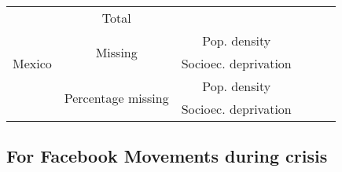 \documentclass[
  11pt,
]{article}
\begin{document}
\begin{table}[ht]
\begin{tabular}{cccccc}
  \multirow{5}{*}{ \;\; Mexico \;\; } & \;\;Total\;\; & & & & \\ 
  \cline{2-6}
  & \multirow{2}{*}{Missing} & \;\;Pop. density\;\; & & & \\
  & & \;\;Socioec. deprivation\;\; & & & \\
  \cline{2-6}
  & \multirow{2}{*}{Percentage missing} &  \;\;Pop. density\;\; & & & \\
  & & \;\;Socioec. deprivation\;\; & & & \\
  
 \end{tabular}
\vspace{5mm}
\end{table}

\subsection{For Facebook Movements during
crisis}\label{for-facebook-movements-during-crisis}
\end{document}
